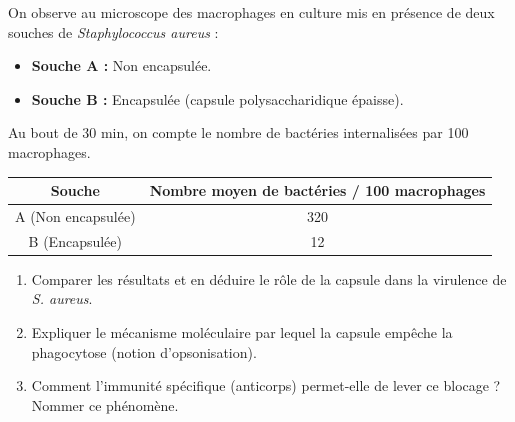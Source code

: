 \documentclass[11pt]{article}
\begin{document}
\begin{exercice}
On observe au microscope des macrophages en culture mis en présence de deux souches de \emph{Staphylococcus aureus} :
\begin{itemize}
    \item \textbf{Souche A :} Non encapsulée.
    \item \textbf{Souche B :} Encapsulée (capsule polysaccharidique épaisse).
\end{itemize}
Au bout de 30 min, on compte le nombre de bactéries internalisées par 100 macrophages.
\begin{center}
\begin{tabular}{|c|c|}\hline
\textbf{Souche} & \textbf{Nombre moyen de bactéries / 100 macrophages} \\ \hline
A (Non encapsulée) & 320 \\ \hline
B (Encapsulée) & 12 \\ \hline
\end{tabular}
\end{center}
\begin{enumerate}
    \item Comparer les résultats et en déduire le rôle de la capsule dans la virulence de \emph{S. aureus}.
    \item Expliquer le mécanisme moléculaire par lequel la capsule empêche la phagocytose (notion d'opsonisation).
    \item Comment l'immunité spécifique (anticorps) permet-elle de lever ce blocage ? Nommer ce phénomène.
\end{enumerate}
\end{exercice}
\end{document}
